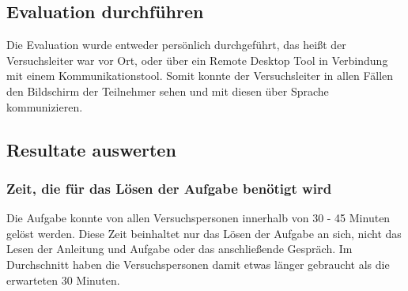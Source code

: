 \subsection{Evaluation durchführen}
Die Evaluation wurde entweder persönlich durchgeführt, das heißt der Versuchsleiter war vor Ort, oder über ein Remote Desktop Tool in Verbindung mit einem Kommunikationstool. Somit konnte der Versuchsleiter in allen Fällen den Bildschirm der Teilnehmer sehen und mit diesen über Sprache kommunizieren.

\subsection{Resultate auswerten}

\subsubsection{Zeit, die für das Lösen der Aufgabe benötigt wird}
Die Aufgabe konnte von allen Versuchspersonen innerhalb von 30 - 45 Minuten gelöst werden. Diese Zeit beinhaltet nur das Lösen der Aufgabe an sich, nicht das Lesen der Anleitung und Aufgabe oder das anschließende Gespräch. Im Durchschnitt haben die Versuchspersonen damit etwas länger gebraucht als die erwarteten 30 Minuten.

